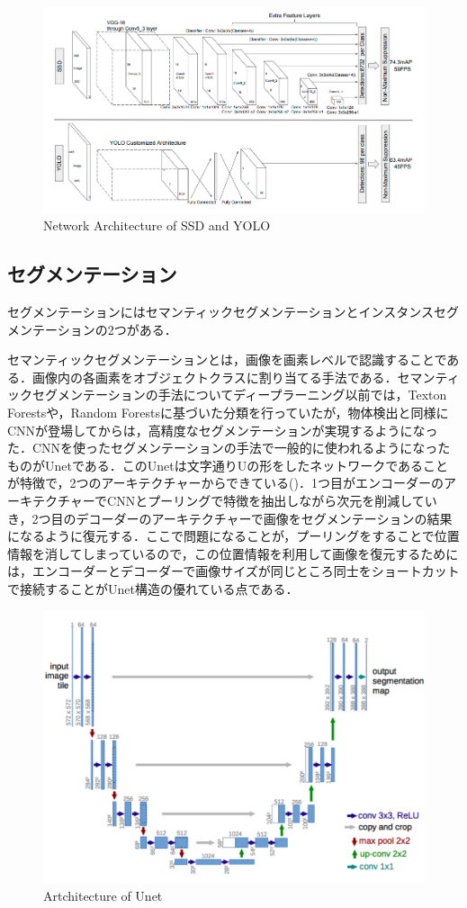 \begin{figure}[H]
	\centering
	\includegraphics[width=0.7\linewidth]{figure/chapter2/yolo_ssd.png}
	\caption{Network Architecture of SSD and YOLO\cite{SSD}}
	\label{fig:SSD}
\end{figure}

\subsection*{セグメンテーション}
セグメンテーションにはセマンティックセグメンテーションとインスタンスセグメンテーションの2つがある．

セマンティックセグメンテーションとは，画像を画素レベルで認識することである．画像内の各画素をオブジェクトクラスに割り当てる手法である．セマンティックセグメンテーションの手法についてディープラーニング以前では，Texton Forests\cite{shotton2008semantic}や，Random Forests\cite{kontschieder2011structured}に基づいた分類を行っていたが，物体検出と同様にCNNが登場してからは，高精度なセグメンテーションが実現するようになった．CNNを使ったセグメンテーションの手法で一般的に使われるようになったものがUnetである\cite{Unet}．このUnetは文字通りUの形をしたネットワークであることが特徴で，2つのアーキテクチャーからできている()．1つ目がエンコーダーのアーキテクチャーでCNNとプーリングで特徴を抽出しながら次元を削減していき，2つ目のデコーダーのアーキテクチャーで画像をセグメンテーションの結果になるように復元する．ここで問題になることが，プーリングをすることで位置情報を消してしまっているので，この位置情報を利用して画像を復元するためには，エンコーダーとデコーダーで画像サイズが同じところ同士をショートカットで接続することがUnet構造の優れている点である．

\begin{figure}[H]
	\centering
	\includegraphics[width=0.7\linewidth]{figure/chapter2/unet.png}
	\caption{Artchitecture of Unet\cite{Unet}}
	\label{fig:Unet}
\end{figure}

